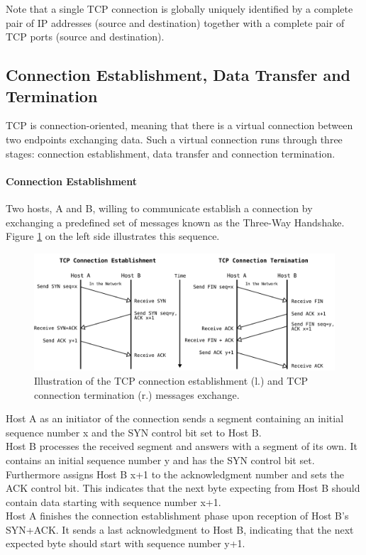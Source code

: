 Note that a single TCP connection is globally uniquely identified by a complete pair of IP addresses (source and destination) together with a complete pair of TCP ports (source and destination).

\subsection*{Connection Establishment, Data Transfer and Termination}

TCP is connection-oriented, meaning that there is a virtual connection between two endpoints exchanging data. Such a virtual connection runs through three stages: connection establishment, data transfer and connection termination.

\paragraph{Connection Establishment}

Two hosts, A and B, willing to communicate establish a connection by exchanging a predefined set of messages known as the Three-Way Handshake. Figure \ref{fig:TCPConnectionEstablishmentAndTermination} on the left side illustrates this sequence. 

\begin{figure}[H]
	\begin{center} 
		\def\svgwidth{1\textwidth}
		\includegraphics[scale=0.24]{../illustrations/importantConcepts/TCPHandshake.pdf} 
		\caption[Caption for the list of figures.]{Illustration of the TCP connection establishment (l.) and TCP connection termination (r.) messages exchange.}
		\label{fig:TCPConnectionEstablishmentAndTermination}
	\end{center}
\end{figure}

Host A as an initiator of the connection sends a segment containing an initial sequence number x and the SYN control bit set to Host B. \smallskip\\Host B processes the received segment and answers with a segment of its own. It contains an initial sequence number y and has the SYN control bit set. Furthermore assigns Host B x+1 to the acknowledgment number and sets the ACK control bit. This indicates that the next byte expecting from Host B should contain data starting with sequence number x+1. \smallskip\\ Host A finishes the connection establishment phase upon reception of Host B's SYN+ACK. It sends a last acknowledgment to Host B, indicating that the next expected byte should start with sequence number y+1.

